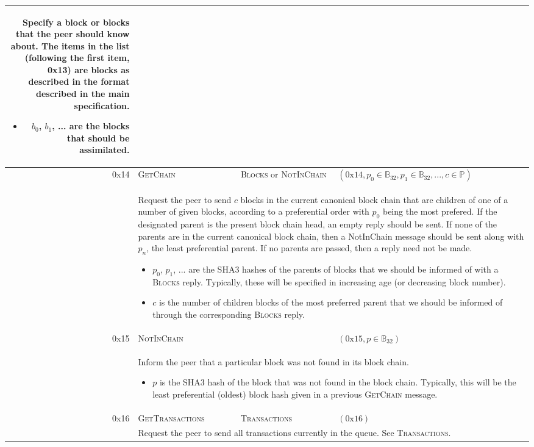 \begin{tabular*}{\columnwidth}[h]{rlll}
{Specify a block or blocks that the peer should know about. The items in the list (following the first item, 0x13) are blocks as described in the format described in the main specification.
\begin{itemize}
\item $b_0$, $b_1$, ... are the blocks that should be assimilated.
\end{itemize}
}\\
\midrule
0x14 & \textsc{GetChain} & \textsc{Blocks} or \textsc{NotInChain} & $(\text{0x}14, p_0 \in \mathbb{B}_{32}, p_1 \in \mathbb{B}_{32}, ..., c \in \mathbb{P})$ \\
& \multicolumn{3}{p{0.8\columnwidth}}{
Request the peer to send $c$ blocks in the current canonical block chain that are children of one of a number of given blocks, according to a preferential order with $p_0$ being the most prefered. If the designated parent is the present block chain head, an empty reply should be sent. If none of the parents are in the current canonical block chain, then a NotInChain message should be sent along with $p_n$, the least preferential parent. If no parents are passed, then a reply need not be made.
\begin{itemize}
\item $p_0$, $p_1$, ... are the SHA3 hashes of the parents of blocks that we should be informed of with a \textsc{Blocks} reply. Typically, these will be specified in increasing age (or decreasing block number).
\item $c$ is the number of children blocks of the most preferred parent that we should be informed of through the corresponding \textsc{Blocks} reply.
\end{itemize}
}\\
\midrule
0x15 & \textsc{NotInChain} && $(\text{0x}15, p \in \mathbb{B}_{32})$ \\
& \multicolumn{3}{p{0.8\columnwidth}}{Inform the peer that a particular block was not found in its block chain.
\begin{itemize}
\item $p$ is the SHA3 hash of the block that was not found in the block chain. Typically, this will be the least preferential (oldest) block hash given in a previous \textsc{GetChain} message.
\end{itemize}
}\\
\midrule
0x16 & \textsc{GetTransactions} & \textsc{Transactions} & $(\text{0x}16)$ \\
& \multicolumn{3}{p{0.8\columnwidth}}{Request the peer to send all transactions currently in the queue. See \textsc{Transactions}.}\\
\bottomrule
\end{tabular*}

